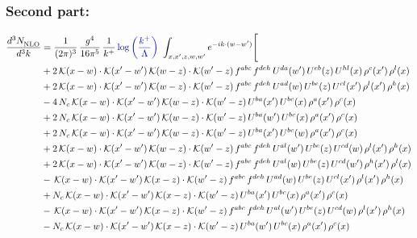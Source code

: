 \documentclass[9pt]{article}
\numberwithin{equation}{section}
\begin{document}
\subsubsection{Second part:}
\begin{align}
\frac{d^{3}N_{\rm NLO}^{\rm}}{d^{3}k}  & = \frac{1}{(2\pi)^{3}}\,\frac{g^{4}}{16\pi^{5}}\,\frac{1}{k^{+}}\,{\color{blue}\log{\left(\frac{k^{+}}{\Lambda}\right)}}\,\,\int_{x,x',z,w,w'}e^{-ik\cdot(w-w')}\Bigg[\notag\\ &+2\,\mathcal{K}(x-w)\cdot\mathcal{K}(x'-w')\,\mathcal{K}(w-z)\cdot\mathcal{K}(w'-z)\,f^{abc}\,f^{deh}\,U^{da}(w')\,U^{eb}(z)\,U^{hl}(x)\,\rho^{c}(x')\,\rho^{l}(x)\notag\\
&+2\,\mathcal{K}(x-w)\cdot\mathcal{K}(x'-w')\,\mathcal{K}(w-z)\cdot\mathcal{K}(w'-z)\,f^{abc}\,f^{deh}\,U^{ad}(w)\,U^{be}(z)\,U^{cl}(x')\,\rho^{l}(x')\,\rho^{h}(x)\notag\\
&-4\,N_{c}\,\mathcal{K}(x-w)\cdot\mathcal{K}(x'-w')\,\mathcal{K}(w-z)\cdot\mathcal{K}(w'-z)\,U^{ba}(x')\,U^{bc}(x)\,\rho^{a}(x')\,\rho^{c}(x)\notag\\
&+2\,N_{c}\,\mathcal{K}(x-w)\cdot\mathcal{K}(x'-w')\,\mathcal{K}(w-z)\cdot\mathcal{K}(w'-z)\,U^{ba}(w')\,U^{bc}(x)\,\rho^{a}(x')\,\rho^{c}(x)\notag\\
&+2\,N_{c}\,\mathcal{K}(x-w)\cdot\mathcal{K}(x'-w')\,\mathcal{K}(w-z)\cdot\mathcal{K}(w'-z)\,U^{ba}(x')\,U^{bc}(w)\,\rho^{a}(x')\,\rho^{c}(x)\notag\\
&+2\,\mathcal{K}(x-w)\cdot\mathcal{K}(x'-w')\,\mathcal{K}(w-z)\cdot\mathcal{K}(w'-z)\,f^{abc}\,f^{deh}\,U^{al}(w')\,U^{be}(z)\,U^{cd}(w)\,\rho^{l}(x')\,\rho^{h}(x)\notag\\
&+2\,\mathcal{K}(x-w)\cdot\mathcal{K}(x'-w')\,\mathcal{K}(w-z)\cdot\mathcal{K}(w'-z)\,f^{abc}\,f^{deh}\,U^{al}(w)\,U^{be}(z)\,U^{cd}(w')\,\rho^{h}(x')\,\rho^{l}(x)\notag\\
&-\,\mathcal{K}(x-w)\cdot\mathcal{K}(x'-w')\,\mathcal{K}(x-z)\cdot\mathcal{K}(w'-z)\,f^{abc}\,f^{deh}\,U^{ad}(w)\,U^{be}(z)\,U^{cl}(x')\,\rho^{l}(x')\,\rho^{h}(x)\notag\\
&+N_{c}\,\mathcal{K}(x-w)\cdot\mathcal{K}(x'-w')\,\mathcal{K}(x-z)\cdot\mathcal{K}(w'-z)\,U^{ba}(x')\,U^{bc}(x)\,\rho^{a}(x')\,\rho^{c}(x)\notag\\
&-\,\mathcal{K}(x-w)\cdot\mathcal{K}(x'-w')\,\mathcal{K}(x-z)\cdot\mathcal{K}(w'-z)\,f^{abc}\,f^{deh}\,U^{al}(w')\,U^{be}(z)\,U^{cd}(w)\,\rho^{l}(x')\,\rho^{h}(x)\notag\\
&-N_{c}\,\mathcal{K}(x-w)\cdot\mathcal{K}(x'-w')\,\mathcal{K}(x-z)\cdot\mathcal{K}(w'-z)\,U^{ba}(w')\,U^{bc}(x)\,\rho^{a}(x')\,\rho^{c}(x)\notag\\

\end{align}
\end{document}
